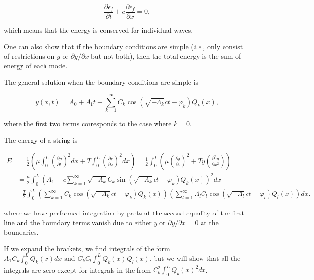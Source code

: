 \documentclass[a4paper,12pt]{report}
\begin{document}
\begin{equation}
	\frac{\partial \epsilon _{f} }{\partial t} + c \frac{\partial \epsilon _{f} }{\partial x} = 0,  
\end{equation}

which means that the energy is conserved for individual waves.

One can also show that if the boundary conditions are simple (\textit{i.e.,} only consist of restrictions on \(y \text { or } \partial y /\partial x \) but not both), then the total energy is the sum of energy of each mode.

The general solution when the boundary conditions are simple is 

\begin{equation}
	y(x,t) = A_0 + A_1 t + \sum_{k=1}^{\infty} C_{k} \cos \left( \sqrt{- \Lambda _{k} }ct-\varphi _{k}   \right)Q_{k}(x),    
\end{equation}

where the first two terms corresponds to the case where \(k=0\). 

The energy of a string is 

\begin{equation}
	\begin{aligned} 
	E &= \frac{1}{2} \left( \mu \int_{0}^{L} \left( \frac{\partial y}{\partial t}  \right)^2dx + T \int_{0}^{L} \left( \frac{\partial y}{\partial x}  \right)^2 dx   \right) = \frac{1}{2} \int_{0}^{L} \left( \mu \left( \frac{\partial y}{\partial t}  \right)^2 + T y\left( \frac{\partial^2 y}{\partial x^2}  \right)\right)\\
      &=\frac{\mu }{2} \int_{0}^{L}  \left( A_1  - c \sum_{k=1}^{\infty} \sqrt{-\Lambda_k} C_k \sin\left(\sqrt{-\Lambda_k} c t - \varphi_k \right) Q_k(x) \right)^2dx \\
	  &- \frac{T}{2} \int_{0}^{L}  \left( \sum_{k=1}^{\infty} C_k \cos\left(\sqrt{-\Lambda_k} c t - \varphi_k \right) Q_k(x) \right) \left( \sum_{l=1}^{\infty} \Lambda_l C_l \cos\left(\sqrt{-\Lambda_l} c t - \varphi_l \right) Q_l(x) \right)  dx.
	  \end{aligned} 
\end{equation}

where we have performed integration by parts at the second equality of the first line and the boundary terms vanish due to either \(y \text { or }  \partial y / \partial x = 0\) at the boundaries. 

If we expand the brackets, we find integrals of the form \(A_1 C_{k} \int_{0}^{L} Q_{k}(x)dx \text { and } C_{k} C_{l} \int_{0}^{L} Q_{k} (x)Q_{l}(x)    \), but we will show that all the integrals are zero except for integrals in the from \(C_{k}^2\int_{0}^{L} Q_{k}(x)^2dx   \). 
\end{document}
